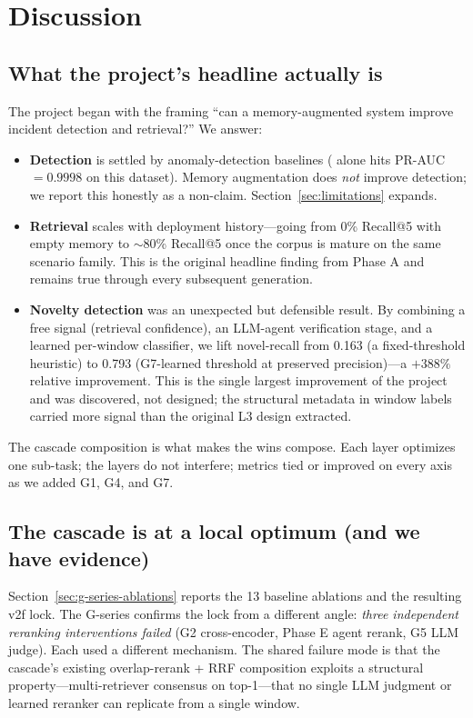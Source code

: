 \section{Discussion}
\label{sec:discussion}

\subsection{What the project's headline actually is}

The project began with the framing ``can a memory-augmented system improve incident detection and retrieval?'' We answer:

\begin{itemize}
\item \textbf{Detection} is settled by anomaly-detection baselines (\hgb{} alone hits PR-AUC $= 0.9998$ on this dataset). Memory augmentation does \emph{not} improve detection; we report this honestly as a non-claim. Section~\ref{sec:limitations} expands.
\item \textbf{Retrieval} scales with deployment history---going from 0\% Recall@5 with empty memory to $\sim$80\% Recall@5 once the corpus is mature on the same scenario family. This is the original headline finding from Phase A and remains true through every subsequent generation.
\item \textbf{Novelty detection} was an unexpected but defensible result. By combining a free signal (retrieval confidence), an LLM-agent verification stage, and a learned per-window classifier, we lift novel-recall from 0.163 (a fixed-threshold heuristic) to 0.793 (G7-learned threshold at preserved precision)---a $+388\%$ relative improvement. This is the single largest improvement of the project and was discovered, not designed; the structural metadata in window labels carried more signal than the original L3 design extracted.
\end{itemize}

The cascade composition is what makes the wins compose. Each layer optimizes one sub-task; the layers do not interfere; metrics tied or improved on every axis as we added G1, G4, and G7.

\subsection{The cascade is at a local optimum (and we have evidence)}

Section~\ref{sec:g-series-ablations} reports the 13 baseline ablations and the resulting v2f lock. The G-series confirms the lock from a different angle: \emph{three independent reranking interventions failed} (G2 cross-encoder, Phase E agent rerank, G5 LLM judge). Each used a different mechanism. The shared failure mode is that the cascade's existing overlap-rerank + RRF composition exploits a structural property---multi-retriever consensus on top-1---that no single LLM judgment or learned reranker can replicate from a single window.

